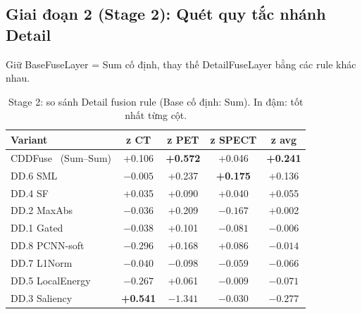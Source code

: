 \subsection{Giai đoạn 2 (Stage 2): Quét quy tắc nhánh Detail}
\label{ssec:ablation-stage2}

Giữ BaseFuseLayer = Sum cố định, thay thế DetailFuseLayer bằng các rule khác nhau.

\begin{table}[H]
\centering
\small
\caption[Ablation Stage 2: so sánh quy tắc nhánh Detail]{Stage 2: so sánh Detail fusion rule (Base cố định: Sum). In đậm: tốt nhất từng cột.}
\label{tab:moduleD-stage2}
\begin{tabular}{lcccc}
\toprule
\textbf{Variant} & \textbf{z CT} & \textbf{z PET} & \textbf{z SPECT} & \textbf{z avg} \\
\midrule
CDDFuse~\cite{zhao2023cddfuse} (Sum--Sum)  & +0.106 & \textbf{+0.572} & +0.046 & \textbf{+0.241} \\
DD.6 SML~\cite{huang2007sml}               & $-0.005$ & +0.237 & \textbf{+0.175} & +0.136 \\
DD.4 SF~\cite{eskicioglu1995sf}            & +0.035 & +0.090 & +0.040 & +0.055 \\
DD.2 MaxAbs~\cite{li2018densefuse}         & $-0.036$ & +0.209 & $-0.167$ & +0.002 \\
DD.1 Gated~\cite{li2020nestfuse}           & $-0.038$ & +0.101 & $-0.081$ & $-0.006$ \\
DD.8 PCNN-soft~\cite{yin2019papcnn}        & $-0.296$ & +0.168 & +0.086 & $-0.014$ \\
DD.7 L1Norm~\cite{li2018densefuse}         & $-0.040$ & $-0.098$ & $-0.059$ & $-0.066$ \\
DD.5 LocalEnergy~\cite{burt1983laplacian}  & $-0.267$ & +0.061 & $-0.009$ & $-0.071$ \\
DD.3 Saliency~\cite{liu2016saliency}       & \textbf{+0.541} & $-1.341$ & $-0.030$ & $-0.277$ \\
\bottomrule
\end{tabular}
\end{table}

